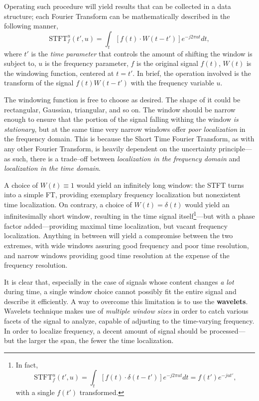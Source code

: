 \documentclass[\documentfontsize, twocolumn]{\classname}
\begin{document}
Operating such procedure will yield results that can be collected in a data
structure; each Fourier Transform can be mathematically described in the following manner,
\begin{equation}\label{eqn:shortTimeFourierTransform}
    \mathrm{STFT}^u_f(t', u) = \int_t \left[f(t) \cdot W(t - t')\right]e^{-j2\pi ut}dt,
\end{equation}
where $t'$ is the \emph{time parameter} that controls the amount of shifting the window is subject to, $u$ is the frequency parameter, $f$ is the original signal $f(t)$, $W(t)$ is the windowing function, centered at $t = t'$. In brief, the operation involved is the transform of the signal $f(t)W(t - t')$ with the frequency variable $u$.

The windowing function is free to choose as desired. The shape of it could be rectangular, Gaussian, triangular, and so on. The window should be narrow enough to ensure that the portion of the signal falling withing the window \emph{is stationary}, but at the same time very narrow windows offer \emph{poor localization} in the frequency domain. This is because the Short Time Fourier Transform, as with any other Fourier Transform, is heavily dependent on the uncertainty principle---as such, there is a trade--off between \emph{localization in the frequency domain} and \emph{localization in the time domain}.

A choice of $W(t)\equiv 1$ would yield an infinitely long window: the STFT turns into a simple FT, providing exemplary frequency localization but nonexistent time localization. On contrary, a choice of $W(t) = \delta(t)$ would yield an infinitesimally short window, resulting in the time signal itself\footnote{In fact, 
\[
    \mathrm{STFT}^u_f(t', u) = \int_t \left[f(t) \cdot \delta(t - t')\right]e^{-j2\pi ut}dt = f(t')e^{-jut'},
\] with a single $f(t')$ transformed.}---but with a phase factor added---providing maximal time localization, but vacant frequency localization. Anything in between will yield a compromise between the two extremes, with wide windows assuring good frequency and poor time resolution, and narrow windows providing good time resolution at the expense of the frequency resolution.

It is clear that, especially in the case of signals whose content changes \emph{a lot} during time, a single window choice cannot possibly fit the entire signal and describe it efficiently. A way to overcome this limitation is to use the \textbf{wavelets}. Wavelets technique makes use of \emph{multiple window sizes} in order to catch various facets of the signal to analyze, capable of adjusting to the time-varying frequency. In order to localize frequency, a decent amount of signal should be processed---but the larger the span, the fewer the time localization.
\end{document}
